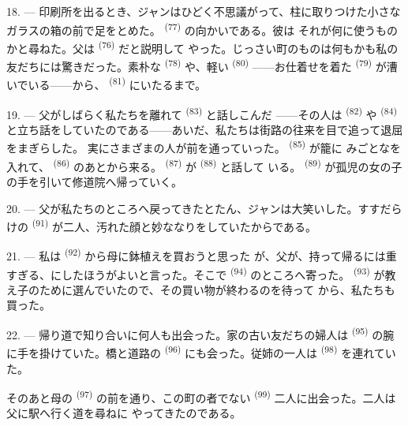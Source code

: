 \VUsaut{3.0mm}

18. --- 印刷所を出るとき、ジャンはひどく不思議がって、柱に取りつけた小さな
ガラスの箱の前で足をとめた。 \textsuperscript{(77)} の向かいである。彼は
それが何に使うものかと尋ねた。父は \textsuperscript{(76)} だと説明して
やった。じっさい町のものは何もかも私の友だちには驚きだった。素朴な
\textsuperscript{(78)} や、軽い \textsuperscript{(80)} ——お仕着せを着た
 \textsuperscript{(79)} が漕いでいる——から、
\textsuperscript{(81)} にいたるまで。

19. --- 父がしばらく私たちを離れて \textsuperscript{(83)} と話しこんだ
——その人は \textsuperscript{(82)} や \textsuperscript{(84)}
と立ち話をしていたのである——あいだ、私たちは街路の往来を目で追って退屈をまぎらした。
実にさまざまの人が前を通っていった。 \textsuperscript{(85)} が籠に
みごとなを入れて、 \textsuperscript{(86)} のあとから来る。
 \textsuperscript{(87)} が \textsuperscript{(88)} と話して
いる。 \textsuperscript{(89)} が孤児の女の子の手を引いて修道院へ帰っていく。

\VUsaut{3.0mm}

20. --- 父が私たちのところへ戻ってきたとたん、ジャンは大笑いした。すすだらけの
 \textsuperscript{(91)} が二人、汚れた顔と妙ななりをしていたからである。

21. --- 私は \textsuperscript{(92)} から母に鉢植えを買おうと思った
が、父が、持って帰るには重すぎる、にしたほうがよいと言った。そこで
 \textsuperscript{(94)} のところへ寄った。
\textsuperscript{(93)} が教え子のために選んでいたので、その買い物が終わるのを待って
から、私たちも買った。

22. --- 帰り道で知り合いに何人も出会った。家の古い友だちの婦人は
\textsuperscript{(95)} の腕に手を掛けていた。橋と道路の \textsuperscript{(96)}
にも会った。従姉の一人は \textsuperscript{(98)} を連れていた。

そのあと母の \textsuperscript{(97)} の前を通り、この町の者でない
 \textsuperscript{(99)} 二人に出会った。二人は父に駅へ行く道を尋ねに
やってきたのである。
\VUsaut{6.0mm}
\VUfilet{22mm}
